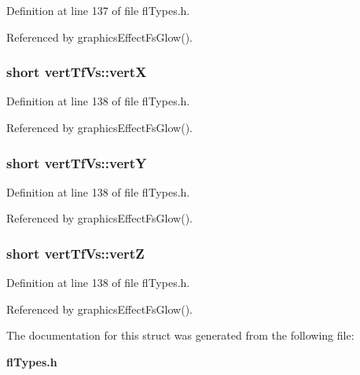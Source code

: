 Definition at line 137 of file fl\-Types.h.

Referenced by graphics\-Effect\-Fs\-Glow().
\subsubsection{\setlength{\rightskip}{0pt plus 5cm}short {\bf vert\-Tf\-Vs::vert\-X}}\label{structvertTfVs_1d105f6888db8ae6843db162a2313b68}




Definition at line 138 of file fl\-Types.h.

Referenced by graphics\-Effect\-Fs\-Glow().
\subsubsection{\setlength{\rightskip}{0pt plus 5cm}short {\bf vert\-Tf\-Vs::vert\-Y}}\label{structvertTfVs_d9eebca0fff2a1d90b5cf92de4bdcec2}




Definition at line 138 of file fl\-Types.h.

Referenced by graphics\-Effect\-Fs\-Glow().
\subsubsection{\setlength{\rightskip}{0pt plus 5cm}short {\bf vert\-Tf\-Vs::vert\-Z}}\label{structvertTfVs_92112c632d0e149171c6136137eb43ca}




Definition at line 138 of file fl\-Types.h.

Referenced by graphics\-Effect\-Fs\-Glow().

The documentation for this struct was generated from the following file:\begin{CompactItemize}
\item 
{\bf fl\-Types.h}\end{CompactItemize}
